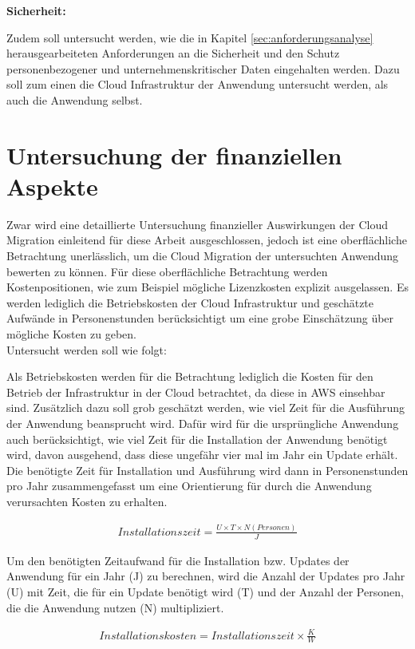 \textbf{Sicherheit:}

Zudem soll untersucht werden, wie die in Kapitel \ref{sec:anforderungsanalyse} herausgearbeiteten Anforderungen an die Sicherheit und den Schutz personenbezogener und unternehmenskritischer Daten eingehalten werden. Dazu soll zum einen die Cloud Infrastruktur der Anwendung untersucht werden, als auch die Anwendung selbst.

\section{Untersuchung der finanziellen Aspekte}
Zwar wird eine detaillierte Untersuchung finanzieller Auswirkungen der Cloud Migration einleitend für diese Arbeit ausgeschlossen, jedoch ist eine oberflächliche Betrachtung unerlässlich, um die Cloud Migration der untersuchten Anwendung bewerten zu können. Für diese oberflächliche Betrachtung werden Kostenpositionen, wie zum Beispiel mögliche Lizenzkosten explizit ausgelassen. Es werden lediglich die Betriebskosten der Cloud Infrastruktur und geschätzte Aufwände in Personenstunden berücksichtigt um eine grobe Einschätzung über mögliche Kosten zu geben. \\

Untersucht werden soll wie folgt:

Als Betriebskosten werden für die Betrachtung lediglich die Kosten für den Betrieb der Infrastruktur in der Cloud betrachtet, da diese in \ac{AWS} einsehbar sind. Zusätzlich dazu soll grob geschätzt werden, wie viel Zeit für die Ausführung der Anwendung beansprucht wird. Dafür wird für die ursprüngliche Anwendung auch berücksichtigt, wie viel Zeit für die Installation der Anwendung benötigt wird, davon ausgehend, dass diese ungefähr vier mal im Jahr ein Update erhält. Die benötigte Zeit für Installation und Ausführung wird dann in Personenstunden pro Jahr zusammengefasst um eine Orientierung für durch die Anwendung verursachten Kosten zu erhalten.

\begin{align}
    Installationszeit = \frac{U \times T \times N(Personen)}{J}
\end{align}

Um den benötigten Zeitaufwand für die Installation bzw. Updates der Anwendung für ein Jahr (J) zu berechnen, wird die Anzahl der Updates pro Jahr (U) mit Zeit, die für ein Update benötigt wird (T) und der Anzahl der Personen, die die Anwendung nutzen (N) multipliziert.

\begin{align}
    Installationskosten = Installationszeit \times \frac{K}{W}
\end{align}

